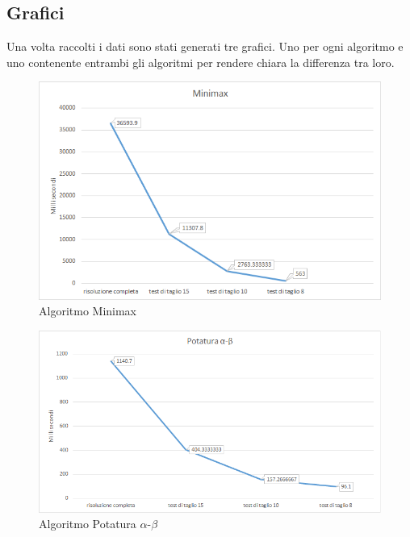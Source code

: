 	\subsection{Grafici}
	Una volta raccolti i dati sono stati generati tre grafici. Uno per ogni algoritmo e uno contenente entrambi gli algoritmi per rendere chiara la differenza tra loro.
	
	\begin{figure}[h!]
		\centering
		\includegraphics[scale=1.02]{grafico1.png}
		\caption{Algoritmo Minimax}
		\label{fig4}
	\end{figure}
	
	\begin{figure}[h!]
		\centering
		\includegraphics[scale=0.91]{grafico2.png}
		\caption{Algoritmo Potatura $\alpha$-$\beta$}
		\label{fig5}
	\end{figure}
	
